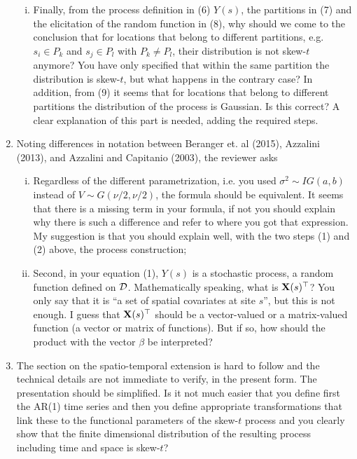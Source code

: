 \documentclass[11pt]{article}
\begin{document}
\begin{enumerate}[1.]
\begin{enumerate}[i.]
    \item Finally, from the process definition in (6) $Y(s)$, the partitions in (7) and the elicitation of the random function in (8), why should we come to the conclusion that for locations that belong to different partitions, e.g. $s_i \in P_k$ and $s_j \in P_l$ with $P_k \neq P_l$, their distribution is not skew-$t$ anymore? You have only specified that within the same partition the distribution is skew-$t$, but what happens in the contrary case? In addition, from (9) it seems that for locations that belong to different partitions the distribution of the process is Gaussian. Is this correct? A clear explanation of this part is needed, adding the required steps.

  \end{enumerate}

  \item Noting differences in notation between Beranger et. al (2015), Azzalini (2013), and Azzalini and Capitanio (2003), the reviewer asks
  \begin{enumerate}[i.]
    \item Regardless of the different parametrization, i.e. you used $\sigma^2 \sim IG(a, b)$ instead of $V ∼ G(\nu/2, \nu/2)$, the formula should be equivalent. It seems that there is a missing term in your formula, if not you should explain why there is such a difference and refer to where you got that expression. My suggestion is that you should explain well, with the two steps (1) and (2) above, the process construction;

    \item Second, in your equation (1), $Y(s)$ is a stochastic process, a random function defined on ${\cal D}$. Mathematically speaking, what is $\mbox{\bf X}(s)^\top$? You only say that it is ``a set of spatial covariates at site $s$'', but this is not enough. I guess that $\mbox{\bf X}(s)^\top$ should be a vector-valued or a matrix-valued function (a vector or matrix of functions). But if so, how should the product with the vector $\beta$ be interpreted?

  \end{enumerate}

  \item The section on the spatio-temporal extension is hard to follow and the technical details are not immediate to verify, in the present form. The presentation should be simplified. Is it not much easier that you define first the AR(1) time series and then you define appropriate transformations that link these to the functional parameters of the skew-$t$ process and you clearly show that the finite dimensional distribution of the resulting process including time and space is skew-$t$?


\end{enumerate}
\end{document}
